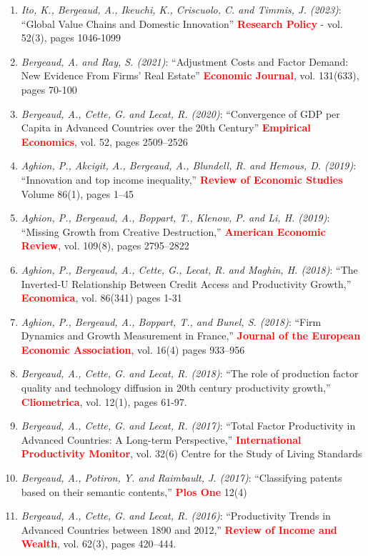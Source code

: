 \documentclass[12pt]{article}
\begin{document}
\begin{footnotesize}
\begin{enumerate}
    \item \emph{Ito, K., Bergeaud, A., Ikeuchi, K., Criscuolo, C. and Timmis, J. (2023)}: ``Global Value Chains and Domestic Innovation'' \textbf{\textcolor{red}{Research Policy}} - vol. 52(3), pages 1046-1099
    \item \emph{Bergeaud, A. and Ray, S. (2021)}: ``Adjustment Costs and Factor Demand: New Evidence From Firms’ Real Estate'' \textbf{\textcolor{red}{Economic Journal}}, vol. 131(633), pages 70-100
    \item \emph{Bergeaud, A., Cette, G. and Lecat, R. (2020)}: ``Convergence of GDP per Capita in Advanced Countries over the 20th Century'' \textbf{\textcolor{red}{Empirical Economics}}, vol. 52, pages 2509–2526
    \item \emph{Aghion, P., Akcigit, A., Bergeaud, A., Blundell, R. and Hemous, D. (2019)}: ``Innovation and top income inequality,'' \textbf{\textcolor{red}{Review of Economic Studies}} Volume 86(1), pages 1–45
    \item \emph{Aghion, P., Bergeaud, A., Boppart, T., Klenow, P. and Li, H. (2019)}: ``Missing Growth from Creative Destruction,'' \textbf{\textcolor{red}{American Economic Review}}, vol. 109(8), pages 2795–2822
    \item \emph{Aghion, P., Bergeaud, A., Cette, G., Lecat, R. and Maghin, H. (2018)}: ``The Inverted-U Relationship Between Credit Access and Productivity Growth,'' \textbf{\textcolor{red}{Economica}}, vol. 86(341) pages 1-31
    \item \emph{Aghion, P., Bergeaud, A., Boppart, T., and Bunel, S. (2018)}: ``Firm Dynamics and Growth Measurement in France,'' \textbf{\textcolor{red}{Journal of the European Economic Association}}, vol. 16(4) pages 933–956
    \item \emph{Bergeaud, A., Cette, G. and Lecat, R. (2018)}: ``The role of production factor quality and technology diffusion in 20th century productivity growth,'' \textbf{\textcolor{red}{Cliometrica}}, vol. 12(1), pages 61-97. 
    \item \emph{Bergeaud, A., Cette, G. and Lecat, R. (2017)}: ``Total Factor Productivity in Advanced Countries: A Long-term Perspective,'' \textbf{\textcolor{red}{International Productivity Monitor}}, vol. 32(6) Centre for the Study of Living Standards
    \item \emph{Bergeaud, A., Potiron, Y. and Raimbault, J. (2017)}: ``Classifying patents based on their semantic contents,'' \textbf{\textcolor{red}{Plos One}} 12(4) 
    \item  \emph{Bergeaud, A., Cette, G. and Lecat, R. (2016)}: ``Productivity Trends in Advanced Countries between 1890 and 2012,'' \textbf{\textcolor{red}{Review of Income and Wealth}}, vol. 62(3), pages 420–444.  
\end{enumerate}
\end{footnotesize}
\end{document}

